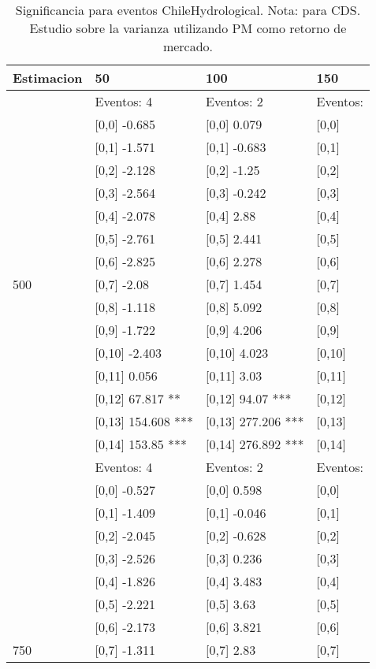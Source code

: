 \begin{table}

\caption{Significancia para eventos ChileHydrological. Nota: para CDS. Estudio sobre la varianza utilizando PM como retorno de mercado.}
\centering
\begin{tabular}[t]{llll}
\toprule
Estimacion & 50 & 100 & 150\\
\midrule
 & Eventos:  4 & Eventos:  2 & Eventos:\\
 & {}[0,0] -0.685 & {}[0,0] 0.079 & {}[0,0]\\
 & {}[0,1] -1.571 & {}[0,1] -0.683 & {}[0,1]\\
 & {}[0,2] -2.128 & {}[0,2] -1.25 & {}[0,2]\\
 & {}[0,3] -2.564 & {}[0,3] -0.242 & {}[0,3]\\
\addlinespace
 & {}[0,4] -2.078 & {}[0,4] 2.88 & {}[0,4]\\
 & {}[0,5] -2.761 & {}[0,5] 2.441 & {}[0,5]\\
 & {}[0,6] -2.825 & {}[0,6] 2.278 & {}[0,6]\\
500 & {}[0,7] -2.08 & {}[0,7] 1.454 & {}[0,7]\\
 & {}[0,8] -1.118 & {}[0,8] 5.092 & {}[0,8]\\
\addlinespace
 & {}[0,9] -1.722 & {}[0,9] 4.206 & {}[0,9]\\
 & {}[0,10] -2.403 & {}[0,10] 4.023 & {}[0,10]\\
 & {}[0,11] 0.056 & {}[0,11] 3.03 & {}[0,11]\\
 & {}[0,12] 67.817 ** & {}[0,12] 94.07 *** & {}[0,12]\\
 & {}[0,13] 154.608 *** & {}[0,13] 277.206 *** & {}[0,13]\\
\addlinespace
 & {}[0,14] 153.85 *** & {}[0,14] 276.892 *** & {}[0,14]\\
 & Eventos:  4 & Eventos:  2 & Eventos:\\
 & {}[0,0] -0.527 & {}[0,0] 0.598 & {}[0,0]\\
 & {}[0,1] -1.409 & {}[0,1] -0.046 & {}[0,1]\\
 & {}[0,2] -2.045 & {}[0,2] -0.628 & {}[0,2]\\
\addlinespace
 & {}[0,3] -2.526 & {}[0,3] 0.236 & {}[0,3]\\
 & {}[0,4] -1.826 & {}[0,4] 3.483 & {}[0,4]\\
 & {}[0,5] -2.221 & {}[0,5] 3.63 & {}[0,5]\\
 & {}[0,6] -2.173 & {}[0,6] 3.821 & {}[0,6]\\
750 & {}[0,7] -1.311 & {}[0,7] 2.83 & {}[0,7]\\

\end{tabular}
\end{table}
